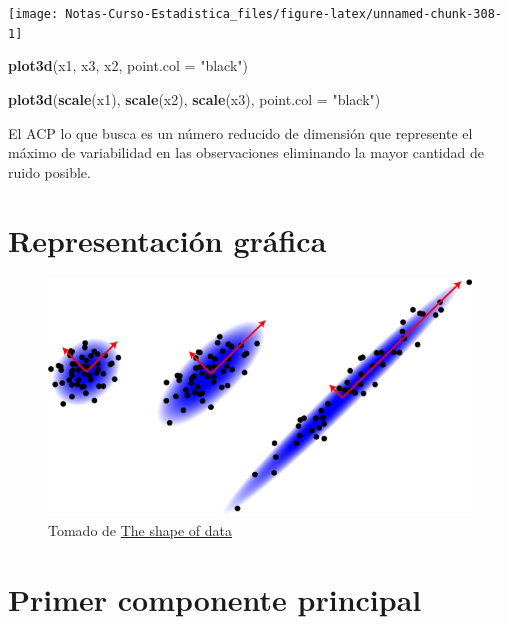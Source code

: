 \documentclass[
  12pt,
]{book}
\newenvironment{Shaded}{\begin{snugshade}}{\end{snugshade}}
\newcommand{\DataTypeTok}[1]{\textcolor[rgb]{0.13,0.29,0.53}{#1}}
\newcommand{\KeywordTok}[1]{\textcolor[rgb]{0.13,0.29,0.53}{\textbf{#1}}}
\newcommand{\NormalTok}[1]{#1}
\newcommand{\StringTok}[1]{\textcolor[rgb]{0.31,0.60,0.02}{#1}}
\theoremstyle{definition}
\theoremstyle{definition}
\theoremstyle{definition}
\theoremstyle{remark}
\begin{document}
\begin{center}\texttt{[image: Notas-Curso-Estadistica\_files/figure-latex/unnamed-chunk-308-1]} \end{center}

\begin{Shaded}
\begin{Highlighting}[]
\KeywordTok{plot3d}\NormalTok{(x1, x3, x2, }\DataTypeTok{point.col =} \StringTok{"black"}\NormalTok{)}

\KeywordTok{plot3d}\NormalTok{(}\KeywordTok{scale}\NormalTok{(x1), }\KeywordTok{scale}\NormalTok{(x2), }\KeywordTok{scale}\NormalTok{(x3), }\DataTypeTok{point.col =} \StringTok{"black"}\NormalTok{)}
\end{Highlighting}
\end{Shaded}

El ACP lo que busca es un número reducido de dimensión que represente el máximo de variabilidad en las observaciones eliminando la mayor cantidad de ruido posible.

\hypertarget{representaciuxf3n-gruxe1fica}{%
\section{Representación gráfica}\label{representaciuxf3n-gruxe1fica}}

\begin{figure}
\centering
\includegraphics{manual_figures/pca.png}
\caption{Tomado de \href{https://shapeofdata.wordpress.com/2013/04/09/principle-component-analysis/}{The shape of data}}
\end{figure}

\hypertarget{primer-componente-principal}{%
\section{Primer componente principal}\label{primer-componente-principal}}
\end{document}
